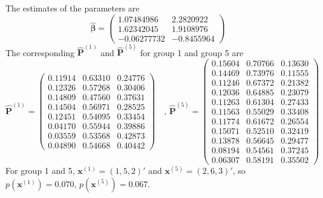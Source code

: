 \documentclass[12pt]{article}
\newcommand{\Pmat}{\mathbf{P}}
\newcommand{\wh}{\widehat}
\begin{document}
The estimates of the parameters are
\begin{equation*}
\wh{\boldsymbol{\beta}} =
\begin{pmatrix}
 1.07484986 & 2.2820922 \\
 1.62342045 & 1.9108976 \\
 -0.06277732 &-0.8455964
\end{pmatrix}
\end{equation*}
The corresponding $\wh{\Pmat}^{(1)}$ and $\wh{\Pmat}^{(5)}$ for group 1 and group 5 are
\begin{equation*}
    \wh{\Pmat}^{(1)} = \begin{pmatrix}

 0.11914 & 0.63310 & 0.24776\\
 0.12326 & 0.57268 & 0.30406\\
 0.14809 & 0.47560 & 0.37631\\
 0.14504 & 0.56971 & 0.28525\\
 0.12451 & 0.54095 & 0.33454\\
 0.04170 & 0.55944 & 0.39886\\
 0.03559 & 0.53568 & 0.42873\\
 0.04890 & 0.54668 & 0.40442
    \end{pmatrix} \quad \text{, }
    \wh{\Pmat}^{(5)} = \begin{pmatrix}
 0.15604 & 0.70766 & 0.13630\\
 0.14469 & 0.73976 & 0.11555\\
 0.11246 & 0.67372 & 0.21382\\
 0.12036 & 0.64885 & 0.23079\\
 0.11263 & 0.61304 & 0.27433\\
 0.11563 & 0.55029 & 0.33408\\
 0.11774 & 0.61672 & 0.26554\\
 0.15071 & 0.52510 & 0.32419\\
 0.13878 & 0.56645 & 0.29477\\
 0.08194 & 0.54561 & 0.37245\\
 0.06307 & 0.58191 & 0.35502
    \end{pmatrix}
\end{equation*}
For group 1 and 5, $\boldsymbol{x}^{(1)} = (1,5,2)'$ and $\boldsymbol{x}^{(5)} = (2,6,3)'$, so $p(\boldsymbol{x}^{(1)}) = 0.070$, $p(\boldsymbol{x}^{(5)}) = 0.067$.

\end{document}
